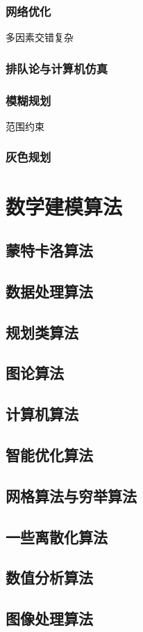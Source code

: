 \documentclass[openany]{progbookcn}
\begin{document}
\section{网络优化}
多因素交错复杂
\section{排队论与计算机仿真}
\section{模糊规划}
范围约束
\section{灰色规划}
\part{数学建模算法}
\chapter{蒙特卡洛算法}
\chapter{数据处理算法}
\chapter{规划类算法}
\chapter{图论算法}
\chapter{计算机算法}
\chapter{智能优化算法}
\chapter{网格算法与穷举算法}
\chapter{一些离散化算法}
\chapter{数值分析算法}
\chapter{图像处理算法}
\end{document}
